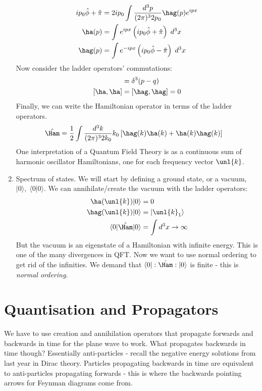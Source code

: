 \documentclass[a4paper, 11pt, normalem]{report}
\newcommand\hphi{\hat{\phi}}
\newcommand\hpi{\hat{\pi}}
\begin{document}
\begin{enumerate}
\begin{align}
            ip_0\hphi + \hpi &= 2ip_0 \int\frac{d^3p}{(2\pi)^32p_0} \hag(p)e^{ipx} \\
            \ha(p) &= \int e^{ipx}\left(ip_0\hphi + \hpi\right)\;d^3x \\
            \hag(p) &= \int e^{-ipx}\left(ip_0\hphi - \hpi\right)\;d^3x
        \end{align}
        Now consider the ladder operators' commutations:
        \begin{align}
            [\ha(p),\hag(q)] &= \delta^3(p-q) \\
            [\ha,\ha] &= [\hag,\hag] = 0
        \end{align}
        Finally, we can write the Hamiltonian operator in terms of the ladder operators.
        \begin{align}
            \hat{\Ham} &= \frac12 \int \frac{d^3k}{(2\pi)^32k_0} k_0\left[\hag(k)\ha(k) + \ha(k)\hag(k)\right]
        \end{align}
        One interpretation of a Quantum Field Theory is as a continuous sum of harmonic oscillator Hamiltonians, one for each frequency vector $\unl{k}$.
    \item Spectrum of states.
        We will start by defining a ground state, or a vacuum, $|0\rangle,\;\langle0|0\rangle$.
        We can annihilate/create the vacuum with the ladder operators:
        \begin{align}
            \ha(\unl{k})|0\rangle &= 0 \\
            \hag(\unl{k})|0\rangle &= |\unl{k}_1\rangle \\
            \langle0|\hat{\Ham}|0\rangle &= \int d^3x \to \infty
        \end{align}
        But the vacuum is an eigenstate of a Hamiltonian with infinite energy.
        This is one of the many divergences in QFT.
        Now we want to use normal ordering to get rid of the infinities.
        We demand that $\langle0|:\hat{\Ham}:|0\rangle$ is finite - this is \textit{normal ordering}.
\end{enumerate}


\chapter{Quantisation and Propagators}
We have to use creation and annihilation operators that propagate forwards and backwards in time for the plane wave to work.
What propagates backwards in time though?
Essentially anti-particles - recall the negative energy solutions from last year in Dirac theory.
Particles propagating backwards in time are equivalent to anti-particles propagating forwards - this is where the backwards pointing arrows for Feynman diagrams come from.
\end{document}
